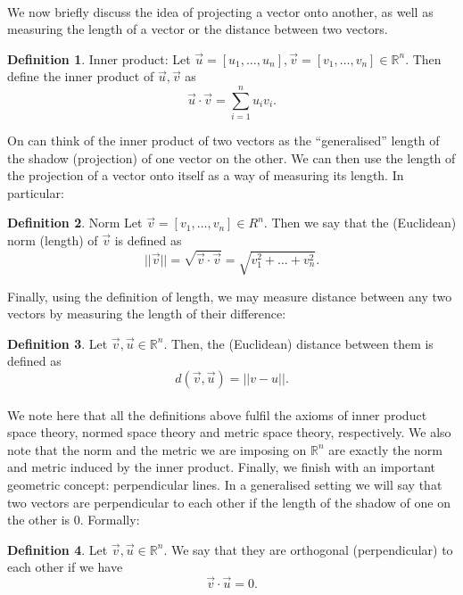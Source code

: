 \documentclass{article}
\theoremstyle{definition}
\newtheorem{definition}{Definition}[section]
\newcommand{\Reals}{\mathbb{R}}
\newcommand{\norm}[1]{||#1||}
\begin{document}
\paragraph{} We now briefly discuss the idea of projecting a vector onto
another, as well as measuring the length of a vector or the distance between two
vectors.
\begin{definition}{Inner product:}
  Let $\vec{u} = [u_1, \hdots, u_n], \vec{v} = [v_1, \hdots, v_n] \in \Reals^n$.
  Then define the inner product of $\vec{u}, \vec{v}$ as
  \[
    \vec{u} \cdot \vec{v} = \sum_{i = 1}^n u_iv_i.
  \]
\end{definition}
On can think of the inner product of two vectors as the ``generalised'' length
of the shadow (projection) of one vector on the other.
We can then use the length of the projection of a vector onto itself as a way of
measuring its length. In particular:
\begin{definition}{Norm}
  Let $\vec{v} = [v_1, \hdots, v_n] \in R^n$. Then we say that the (Euclidean) norm (length) of
  $\vec{v}$ is defined as
  \[
    \norm{\vec{v}} = \sqrt{\vec{v} \cdot \vec{v}} = \sqrt{v_1^2 + \hdots + v_n^2}.
  \]
\end{definition}
Finally, using the definition of length, we may measure distance between any two
vectors by measuring the length of their difference:
\begin{definition}
  Let $\vec{v}, \vec{u} \in \Reals^n$. Then, the (Euclidean) distance between
  them is defined as
  \[
    d(\vec{v}, \vec{u}) = \norm{v - u}.
  \]
\end{definition}
\paragraph{} We note here that all the definitions above fulfil the axioms of
inner product space theory, normed space theory and metric space theory,
respectively. We also note that the norm and the metric we are imposing on
$\Reals^n$ are exactly the norm and metric induced by the inner product.
Finally, we finish with an important geometric concept: perpendicular lines.
In a generalised setting we will say that two vectors are perpendicular to each
other if the length of the shadow of one on the other is $0$. Formally:
\begin{definition}
  Let $\vec{v}, \vec{u} \in \Reals^n$. We say that they are orthogonal
  (perpendicular) to each other if we have
  \[
    \vec{v} \cdot \vec{u} = 0.
  \]
\end{definition}
\end{document}
